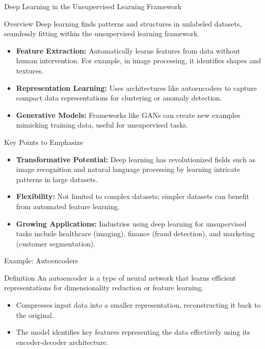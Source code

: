 \documentclass[aspectratio=169]{beamer}
\begin{document}
\begin{frame}[fragile]{Deep Learning in the Unsupervised Learning Framework}
    \begin{block}{Overview}
        Deep learning finds patterns and structures in unlabeled datasets, seamlessly fitting within the unsupervised learning framework.
    \end{block}

    \begin{itemize}
        \item \textbf{Feature Extraction:} Automatically learns features from data without human intervention. For example, in image processing, it identifies shapes and textures.
        \item \textbf{Representation Learning:} Uses architectures like autoencoders to capture compact data representations for clustering or anomaly detection.
        \item \textbf{Generative Models:} Frameworks like GANs can create new examples mimicking training data, useful for unsupervised tasks.
    \end{itemize}
\end{frame}

\begin{frame}[fragile]{Key Points to Emphasize}
    \begin{itemize}
        \item \textbf{Transformative Potential:} Deep learning has revolutionized fields such as image recognition and natural language processing by learning intricate patterns in large datasets.
        \item \textbf{Flexibility:} Not limited to complex datasets; simpler datasets can benefit from automated feature learning.
        \item \textbf{Growing Applications:} Industries using deep learning for unsupervised tasks include healthcare (imaging), finance (fraud detection), and marketing (customer segmentation).
    \end{itemize}
\end{frame}

\begin{frame}[fragile]{Example: Autoencoders}
    \begin{block}{Definition}
        An autoencoder is a type of neural network that learns efficient representations for dimensionality reduction or feature learning.
    \end{block}

    \begin{itemize}
        \item Compresses input data into a smaller representation, reconstructing it back to the original.
        \item The model identifies key features representing the data effectively using its encoder-decoder architecture.
    \end{itemize}
\end{frame}
\end{document}
